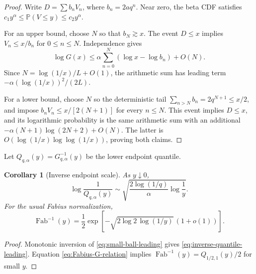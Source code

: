 \documentclass[11pt]{article}
\newtheorem{corollary}[theorem]{Corollary}
\theoremstyle{definition}
\theoremstyle{remark}
\newcommand{\Prob}{\mathbb{P}}
\newcommand{\Fab}{\operatorname{Fab}}
\begin{document}
\begin{proof}
Write \(D=\sum b_nV_n\), where \(b_n=2aq^n\).  Near zero, the beta CDF
satisfies \(c_1y^\alpha\le\Prob(V\le y)\le c_2y^\alpha\).

For an upper bound, choose \(N\) so that \(b_N\gtrsim x\).  The event
\(D\le x\) implies \(V_n\le x/b_n\) for \(0\le n\le N\).  Independence gives
\[
 \log G(x)\le\alpha\sum_{n=0}^{N}(\log x-\log b_n)+O(N).
\]
Since \(N=\log(1/x)/L+O(1)\), the arithmetic sum has leading term
\(-\alpha(\log(1/x))^2/(2L)\).

For a lower bound, choose \(N\) so the deterministic tail
\(\sum_{n>N}b_n=2q^{N+1}\le x/2\), and impose
\(b_nV_n\le x/[2(N+1)]\) for every \(n\le N\).  This event implies
\(D\le x\), and its logarithmic probability is the same arithmetic sum with
an additional \(-\alpha(N+1)\log(2N+2)+O(N)\).  The latter is
\(O(\log(1/x)\log\log(1/x))\), proving both claims.
\end{proof}

Let \(Q_{q,\alpha}(y)=G_{q,\alpha}^{-1}(y)\) be the lower endpoint quantile.

\begin{corollary}[Inverse endpoint scale]
\label{cor:inverse-quantile}
As \(y\downarrow0\),
\begin{equation}
 \boxed{
 \log\frac1{Q_{q,\alpha}(y)}
 \sim\sqrt{\frac{2\log(1/q)}{\alpha}\log\frac1y}.}
 \label{eq:inverse-quantile-leading}
\end{equation}
For the usual Fabius normalization,
\begin{equation}
 \Fab^{-1}(y)
 =\frac12\exp\left[-\sqrt{2\log2\,\log(1/y)}\,(1+o(1))\right].
 \label{eq:inverse-Fabius-leading}
\end{equation}
\end{corollary}

\begin{proof}
Monotonic inversion of \eqref{eq:small-ball-leading} gives
\eqref{eq:inverse-quantile-leading}.  Equation
\eqref{eq:Fabius-G-relation} implies
\(\Fab^{-1}(y)=Q_{1/2,1}(y)/2\) for small \(y\).
\end{proof}
\end{document}
